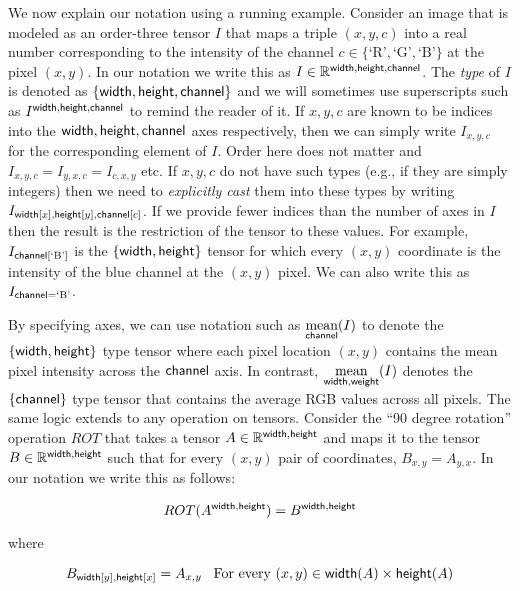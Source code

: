 \documentclass{article}
\newcommand{\mean}[1]{\funax{mean}{#1}}
\begin{document}
We now explain our notation using a running example. Consider an image that is modeled as an order-three tensor $I$ that maps a triple $(x,y,c)$ into a real number corresponding to the intensity of the channel  $c\in \{ \text{`R'}, \text{`G'}, \text{`B'} \}$ at the  pixel $(x,y)$.
In our notation we write this as $I \in \mathbb{R}^{\mathsf{width},\mathsf{height},\mathsf{channel}}$. 
The \emph{type} of $I$ is denoted as $\{ \mathsf{width},\mathsf{height},\mathsf{channel} \}$ and we will sometimes use  superscripts such as $I^{\mathsf{width},\mathsf{height},\mathsf{channel}}$ to remind the reader of it. 
If $x,y,c$ are known to be indices into the $\mathsf{width},\mathsf{height},\mathsf{channel}$ axes respectively, then we can simply write $I_{x,y,c}$ for the corresponding element of $I$. Order here does not matter and $I_{x,y,c} = I_{y,x,c}=I_{c,x,y}$ etc. 
If $x,y,c$ do not have such types (e.g., if they are simply integers) then we need to \emph{explicitly cast} them into these types by writing $I_{\mathsf{width}[x],\mathsf{height}[y],\mathsf{channel}[c]}$.
If we provide fewer indices than the number of axes in $I$ then the result is the restriction of the tensor to these values.
For example, $I_{\mathsf{channel}[\text{`B'}]}$ is the $\{ \mathsf{width} , \mathsf{height} \}$ tensor for which every $(x,y)$  coordinate is the intensity of the blue channel at the $(x,y)$ pixel. We can also write this as $I_{\mathsf{channel}=\text{`B'}}$.


By specifying axes, we can use notation such as  $\mean{\name{channel}}(I)$ to denote the $\{ \mathsf{width} , \mathsf{height} \}$ type tensor where each pixel location $(x,y)$ contains the mean pixel intensity across the $\mathsf{channel}$ axis.
In contrast, $\mean{\name{width},\name{weight}}(I)$ denotes the $\{ \mathsf{channel} \}$ type tensor that contains the average RGB values across all pixels.
The same logic extends to any operation on tensors. Consider the ``90 degree rotation'' operation $ROT$ that takes a tensor $A \in \mathbb{R}^{\mathsf{width},\mathsf{height}}$ and maps it to the tensor $B \in \mathbb{R}^{\mathsf{width},\mathsf{height}}$ such that for every $(x,y)$ pair of coordinates, $B_{x,y} = A_{y,x}$.
In our notation we write this as follows: 

\begin{equation}
  ROT(A^{\mathsf{width},\mathsf{height}}) = B^{\mathsf{width},\mathsf{height}} \label{eq:rotsig} 
\end{equation}

where

\begin{equation}
  B_{\mathsf{width}[y],\mathsf{height}[x]} = A_{x,y} \;\;\; \text{For every } (x,y) \in \mathsf{width}(A)\times \mathsf{height}(A) \label{eq:rotate}
\end{equation}
\end{document}
